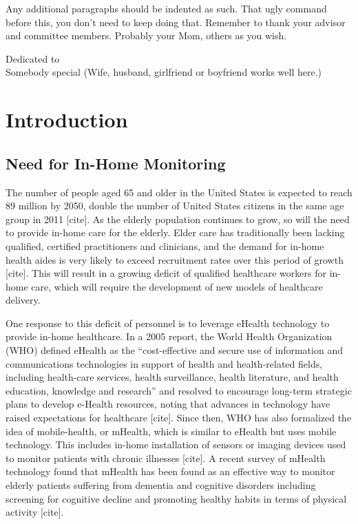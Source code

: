 \documentclass[12pt]{report}
\begin{document}
\setlength{\parindent}{2em}
Any additional paragraphs should be indented as such.  That ugly command before this, you don't need to keep doing that. Remember to thank your advisor and committee members. Probably your Mom, others as you wish. 
%
\newpage
\thispagestyle{plain}
\vspace*{3in}
\begin{center}
Dedicated to\\
Somebody special (Wife, husband, girlfriend or boyfriend works well
here.)
\end{center}
%
%
%
\newpage
\setcounter{page}{1}
\setlength{\parindent}{2em}

\chapter{Introduction}

\section{Need for In-Home Monitoring}
The number of people aged 65 and older in the United States is expected to reach 89 million by 2050, double the number of United States citizens in the same age group in 2011 [cite]. As the elderly population continues to grow, so will the need to provide in-home care for the elderly. Elder care has traditionally been lacking qualified, certified practitioners and clinicians, and the demand for in-home health aides is very likely to exceed recruitment rates over this period of growth [cite]. This will result in a growing deficit of qualified healthcare workers for in-home care, which will require the development of new models of healthcare delivery.

One response to this deficit of personnel is to leverage eHealth technology to provide in-home healthcare. In a 2005 report, the World Health Organization (WHO) defined eHealth as the “cost-effective and secure use of information and communications technologies in support of health and health-related fields, including health-care services, health surveillance, health literature, and health education, knowledge and research” and resolved to encourage long-term strategic plans to develop e-Health resources, noting that advances in technology have raised expectations for healthcare [cite]. Since then, WHO has also formalized the idea of mobile-health, or mHealth, which is similar to eHealth but uses mobile technology. This includes in-home installation of sensors or imaging devices used to monitor patients with chronic illnesses [cite]. A recent survey of mHealth technology found that mHealth has been found as an effective way to monitor elderly patients suffering from dementia and cognitive disorders including screening for cognitive decline and promoting healthy habits in terms of physical activity [cite].
\end{document}
